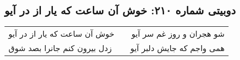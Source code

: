 \begin{center}
\section*{دوبیتی شماره ۲۱۰: خوش آن ساعت که یار از در آیو}
\label{sec:210}
\begin{longtable}{l p{0.5cm} r}
خوش آن ساعت که یار از در آیو
&&
شو هجران و روز غم سر آیو
\\
زدل بیرون کنم جانرا بصد شوق
&&
همی واجم که جایش دلبر آیو
\\
\end{longtable}
\end{center}
